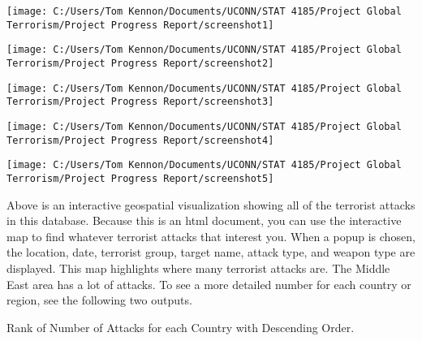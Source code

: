 \documentclass[11pt,letterpaper,]{article}
\newenvironment{Shaded}{\begin{snugshade}}{\end{snugshade}}
\newcommand{\KeywordTok}[1]{\textcolor[rgb]{0.13,0.29,0.53}{\textbf{{#1}}}}
\newcommand{\DataTypeTok}[1]{\textcolor[rgb]{0.13,0.29,0.53}{{#1}}}
\newcommand{\DecValTok}[1]{\textcolor[rgb]{0.00,0.00,0.81}{{#1}}}
\newcommand{\StringTok}[1]{\textcolor[rgb]{0.31,0.60,0.02}{{#1}}}
\newcommand{\NormalTok}[1]{{#1}}
\theoremstyle{definition}
\theoremstyle{definition}
\theoremstyle{definition}
\theoremstyle{remark}
\begin{document}
\begin{center}\texttt{[image: C:/Users/Tom Kennon/Documents/UCONN/STAT 4185/Project Global Terrorism/Project Progress Report/screenshot1]} \end{center}

\begin{center}\texttt{[image: C:/Users/Tom Kennon/Documents/UCONN/STAT 4185/Project Global Terrorism/Project Progress Report/screenshot2]} \end{center}

\begin{center}\texttt{[image: C:/Users/Tom Kennon/Documents/UCONN/STAT 4185/Project Global Terrorism/Project Progress Report/screenshot3]} \end{center}

\begin{center}\texttt{[image: C:/Users/Tom Kennon/Documents/UCONN/STAT 4185/Project Global Terrorism/Project Progress Report/screenshot4]} \end{center}

\begin{center}\texttt{[image: C:/Users/Tom Kennon/Documents/UCONN/STAT 4185/Project Global Terrorism/Project Progress Report/screenshot5]} \end{center}

Above is an interactive geospatial visualization showing all of the
terrorist attacks in this database. Because this is an html document,
you can use the interactive map to find whatever terrorist attacks that
interest you. When a popup is chosen, the location, date, terrorist
group, target name, attack type, and weapon type are displayed. This map
highlights where many terrorist attacks are. The Middle East area has a
lot of attacks. To see a more detailed number for each country or
region, see the following two outputs.

Rank of Number of Attacks for each Country with Descending Order.

\begin{Shaded}
\end{Shaded}
\end{document}
